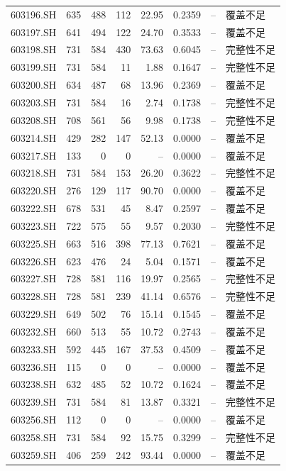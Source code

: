 \documentclass[10pt,a4paper]{article}
\begin{document}
\begin{longtable}{lrrr r r r l}
603196.SH & 635 & 488 & 112 & 22.95 & 0.2359 & -- & 覆盖不足\\
603197.SH & 641 & 494 & 122 & 24.70 & 0.3533 & -- & 覆盖不足\\
603198.SH & 731 & 584 & 430 & 73.63 & 0.6045 & -- & 完整性不足\\
603199.SH & 731 & 584 & 11 & 1.88 & 0.1647 & -- & 完整性不足\\
603200.SH & 634 & 487 & 68 & 13.96 & 0.2369 & -- & 覆盖不足\\
603203.SH & 731 & 584 & 16 & 2.74 & 0.1738 & -- & 完整性不足\\
603208.SH & 708 & 561 & 56 & 9.98 & 0.1738 & -- & 完整性不足\\
603214.SH & 429 & 282 & 147 & 52.13 & 0.0000 & -- & 覆盖不足\\
603217.SH & 133 & 0 & 0 & -- & 0.0000 & -- & 覆盖不足\\
603218.SH & 731 & 584 & 153 & 26.20 & 0.3622 & -- & 完整性不足\\
603220.SH & 276 & 129 & 117 & 90.70 & 0.0000 & -- & 覆盖不足\\
603222.SH & 678 & 531 & 45 & 8.47 & 0.2597 & -- & 覆盖不足\\
603223.SH & 722 & 575 & 55 & 9.57 & 0.2030 & -- & 完整性不足\\
603225.SH & 663 & 516 & 398 & 77.13 & 0.7621 & -- & 覆盖不足\\
603226.SH & 623 & 476 & 24 & 5.04 & 0.1571 & -- & 覆盖不足\\
603227.SH & 728 & 581 & 116 & 19.97 & 0.2565 & -- & 完整性不足\\
603228.SH & 728 & 581 & 239 & 41.14 & 0.6576 & -- & 完整性不足\\
603229.SH & 649 & 502 & 76 & 15.14 & 0.1545 & -- & 覆盖不足\\
603232.SH & 660 & 513 & 55 & 10.72 & 0.2743 & -- & 覆盖不足\\
603233.SH & 592 & 445 & 167 & 37.53 & 0.4509 & -- & 覆盖不足\\
603236.SH & 115 & 0 & 0 & -- & 0.0000 & -- & 覆盖不足\\
603238.SH & 632 & 485 & 52 & 10.72 & 0.1624 & -- & 覆盖不足\\
603239.SH & 731 & 584 & 81 & 13.87 & 0.3321 & -- & 完整性不足\\
603256.SH & 112 & 0 & 0 & -- & 0.0000 & -- & 覆盖不足\\
603258.SH & 731 & 584 & 92 & 15.75 & 0.3299 & -- & 完整性不足\\
603259.SH & 406 & 259 & 242 & 93.44 & 0.0000 & -- & 覆盖不足\\

\end{longtable}
\end{document}
